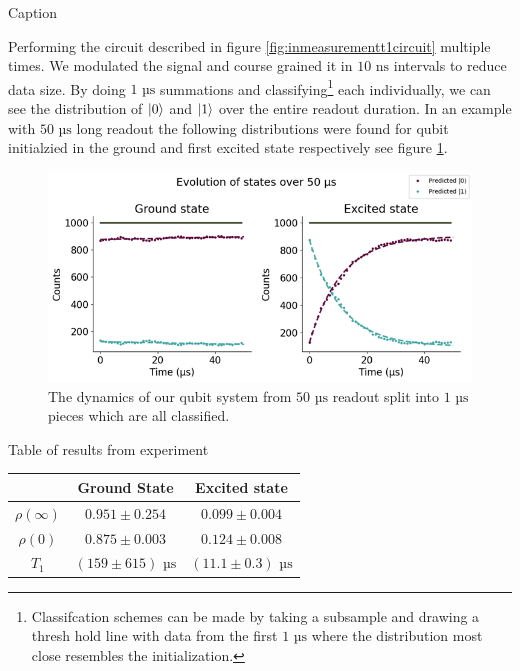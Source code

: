 \begin{marginfigure}[-2cm]
    \centering
    \caption{Caption}
    \label{fig:inmeasurementt1circuit}
\end{marginfigure}

Performing the circuit described in figure \ref{fig:inmeasurementt1circuit} multiple times. We modulated the signal and course grained it in $10 \text{ ns}$ intervals to reduce data size. By doing $1 \text{ µs}$ summations and classifying\footnote{Classifcation schemes can be made by taking a subsample and drawing a thresh hold line with data from the first $1 \text{ µs}$ where the distribution most close resembles the initialization.} each individually, we can see the distribution of $\ket{0}$ and $\ket{1}$ over the entire readout duration. In an example with $50 \text{ µs}$ long readout the following distributions were found for qubit initialzied in the ground and first excited state respectively see figure \ref{fig:continous_calibration_decays}. 
\begin{figure}
    \centering
    \includegraphics{Figs/calibrations/contiuous/decays.png}
    \caption{The dynamics of our qubit system from $50 \text{ µs}$ readout split into $1 \text{ µs}$ pieces which are all classified.}
    \label{fig:continous_calibration_decays}
\end{figure}
\begin{margintable}
    \centering
    \caption{Table of results from experiment}
    \begin{tabular}{c|cc}
        & Ground State & Excited state \\
        \hline
        $\rho(\infty)$&$0.951 \pm 0.254$&$0.099 \pm 0.004$ \\
        $\rho(0)$&$0.875 \pm 0.003$&$0.124 \pm 0.008$\\
        $T_1$ &$(159 \pm 615) \text{ µs}$&$(11.1 \pm 0.3)  \text{ µs}$\\
    \end{tabular}
    \label{tab:continous_calibration_decays_results}
\end{margintable}
    
